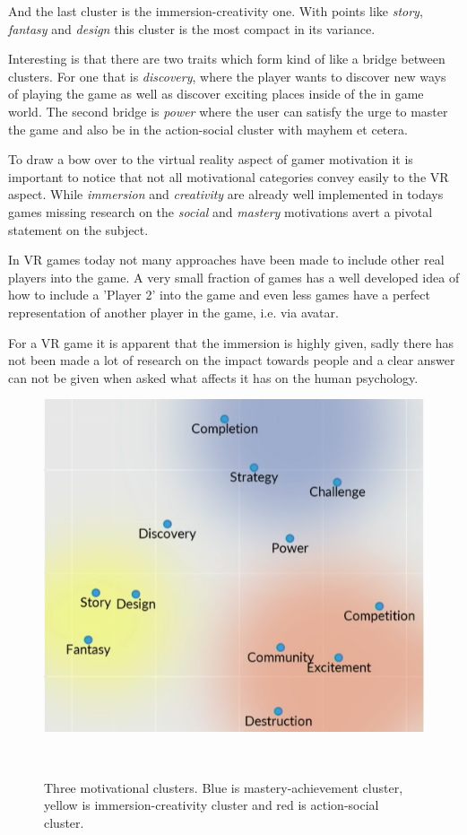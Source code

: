 And the last cluster is the immersion-creativity one. With points like 
\textit{story}, \textit{fantasy} and \textit{design} this cluster is the most 
compact in its variance. 

Interesting is that there are two traits which form kind of like a bridge 
between clusters. For one that is \textit{discovery}, where the player wants to 
discover new ways of playing the game as well as discover exciting places 
inside of the in game world. The second bridge is \textit{power} where the user 
can satisfy the urge to master the game and also be in the action-social 
cluster with mayhem et cetera. 

To draw a bow over to the virtual reality aspect of gamer motivation it is 
important to notice that not all motivational categories convey easily to the 
VR aspect. While \textit{immersion} and \textit{creativity} are already well 
implemented in todays games missing research on the \textit{social} and 
\textit{mastery} motivations avert a pivotal statement on the subject. 

In VR games today not many approaches have been made to include other real 
players into the game. A very small fraction of games has a well developed idea 
of how to include a 'Player 2' into the game and even less games have a perfect 
representation of another player in the game, i.e. via avatar. 

For a VR game it is apparent that the immersion is highly given, sadly there 
has not been made a lot of research on the impact towards people and a clear 
answer can not be given when asked what affects it has on the human psychology. 

\begin{figure}
	\centering
	\includegraphics[width=0.99\columnwidth]{./figures/clusters}
	\caption[motivation]{Three motivational clusters. Blue is 
	mastery-achievement cluster, yellow is immersion-creativity cluster and red 
	is action-social cluster.~\footnotemark[6]}~\label{fig:motivationClusters}
\end{figure}

